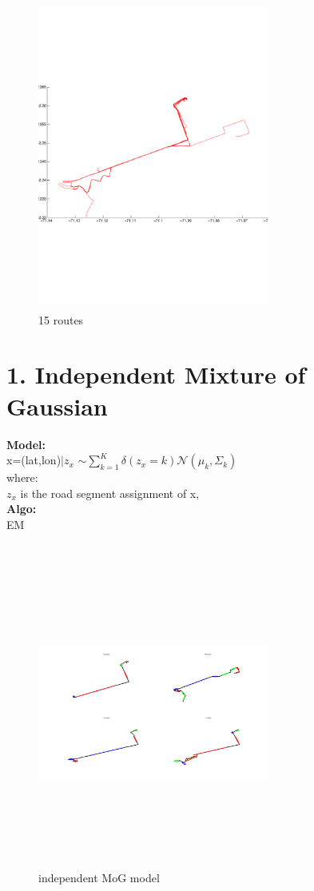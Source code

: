 \documentclass{article}
\begin{document}
\begin{spacing}{1.1}
\begin{figure}
\caption{15 routes}
  \centering
\includegraphics[width=3in,height=4in]{routes.pdf}
\end{figure}

\newpage
\section{1. Independent Mixture of Gaussian}
{\bf Model:}\\
x=(lat,lon)$|z_x$ $\sim \sum\limits_{k=1}^{K}\delta(z_x=k)\mathcal{N}(\mu_k,\Sigma_{k})$\\
where:\\
$z_x$ is the road segment assignment of x, \\
{\bf Algo:}\\
EM\\\\
\begin{figure}[h]
\caption{independent MoG model}
  \centering
\includegraphics[width=3in,height=4in]{ind_cluster.jpg}
\end{figure}



\end{spacing}
\end{document}
